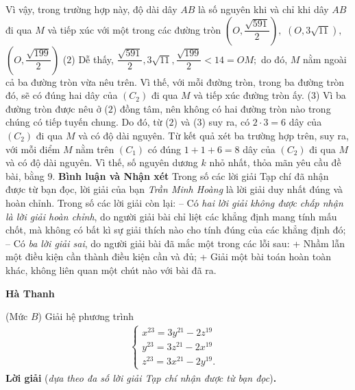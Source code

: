 \begin{multicols}{2}
	\vskip 0.05cm
	Vì vậy, trong trường hợp này, độ dài dây $AB$ là số nguyên khi và chỉ khi dây $AB$ đi qua $M$ và tiếp xúc với một trong các đường tròn $\left( {O,\dfrac{{\sqrt {591} }}{2}} \right),$    $\left( {O,3\sqrt {11} } \right),$      $\left( {O,\dfrac{{\sqrt {199} }}{2}}\right)$ \hfill ($2$)
	\vskip 0.05cm
	Dễ thấy, $\dfrac{{\sqrt {591} }}{2},3\sqrt {11} ,\dfrac{{\sqrt {199} }}{2} < 14 = OM;$  do đó, $M$ nằm ngoài cả ba đường tròn vừa nêu trên. Vì thế, với mỗi đường tròn, trong ba đường tròn đó, sẽ có đúng hai dây của  $(C_2)$ đi qua $M$ và tiếp xúc đường tròn ấy.                  \hfill ($3$)
	\vskip 0.05cm
	Vì ba đường tròn được nêu ở ($2$) đồng tâm, nên không có hai đường tròn nào trong chúng có tiếp tuyến chung. Do đó, từ ($2$) và ($3$) suy ra, có $2 \cdot 3 = 6$  dây của  $(C_2)$ đi qua $M$ và có độ dài nguyên.
	\vskip 0.05cm
	Từ kết quả xét ba trường hợp trên, suy ra, với mỗi điểm $M$ nằm trên $(C_1)$  có đúng $1 + 1 + 6 = 8$ dây của $(C_2)$  đi qua $M$ và có độ dài nguyên. Vì thế, số nguyên dương $k$ nhỏ nhất, thỏa mãn yêu cầu đề bài, bằng $9$.
	\vskip 0.05cm
	\textbf{\color{thachthuctoanhoc}Bình luận và Nhận xét}
	\vskip 0.05cm
	Trong số các lời giải Tạp chí đã nhận được từ bạn đọc, lời giải của bạn \textit{Trần Minh Hoàng} là lời giải duy nhất đúng và hoàn chỉnh. Trong số các lời giải còn lại:
	\vskip 0.05cm
	-- Có \textit{hai lời giải không được chấp nhận là lời giải hoàn chỉnh}, do người giải bài chỉ liệt các khẳng định mang tính mấu chốt, mà không có bất kì sự giải thích nào cho tính đúng của các khẳng định đó;
	\vskip 0.05cm
	-- Có \textit{ba lời giải sai}, do người giải bài đã mắc một trong các lỗi sau:
	\vskip 0.05cm
	+ Nhầm lẫn một điều kiện cần thành điều kiện cần và đủ;
	\vskip 0.05cm
	+ Giải một bài toán hoàn toàn khác, không liên quan một chút nào với bài đã ra.
	\begin{flushright}
		\textbf{\color{thachthuctoanhoc}Hà Thanh}
	\end{flushright}
	{}
	(Mức $B$) Giải hệ phương trình
	\begin{align*}
		\begin{cases}
			x^{23}=3y^{21}-2z^{19}&\\
			y^{23}=3z^{21}-2x^{19}&\\
			z^{23}=3x^{21}-2y^{19}.
		\end{cases}
	\end{align*}
	\textbf{\color{thachthuctoanhoc}Lời giải} (\textit{dựa theo đa số lời giải Tạp chí nhận được từ bạn đọc})\textbf{\color{thachthuctoanhoc}.}

\end{multicols}
